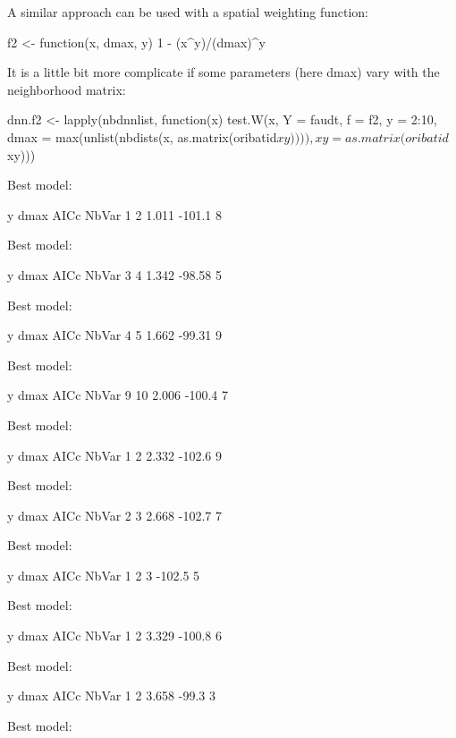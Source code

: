\documentclass[a4paper]{article}
\begin{document}
A similar approach can be used with a spatial weighting function:
\begin{Schunk}
\begin{Sinput}
 f2 <- function(x, dmax, y) {
     1 - (x^y)/(dmax)^y
 }
\end{Sinput}
\end{Schunk}
It is a little bit more complicate if some parameters (here dmax) vary with the neighborhood matrix:
\begin{Schunk}
\begin{Sinput}
 dnn.f2 <- lapply(nbdnnlist, function(x) test.W(x, Y = faudt, 
     f = f2, y = 2:10, dmax = max(unlist(nbdists(x, as.matrix(oribatid$xy)))), 
     xy = as.matrix(oribatid$xy)))
\end{Sinput}
\begin{Soutput}
Best model:


  y  dmax   AICc NbVar
1 2 1.011 -101.1     8


Best model:


  y  dmax   AICc NbVar
3 4 1.342 -98.58     5


Best model:


  y  dmax   AICc NbVar
4 5 1.662 -99.31     9


Best model:


   y  dmax   AICc NbVar
9 10 2.006 -100.4     7


Best model:


  y  dmax   AICc NbVar
1 2 2.332 -102.6     9


Best model:


  y  dmax   AICc NbVar
2 3 2.668 -102.7     7


Best model:


  y dmax   AICc NbVar
1 2    3 -102.5     5


Best model:


  y  dmax   AICc NbVar
1 2 3.329 -100.8     6


Best model:


  y  dmax  AICc NbVar
1 2 3.658 -99.3     3


Best model:



\end{Soutput}
\end{Schunk}
\end{document}

